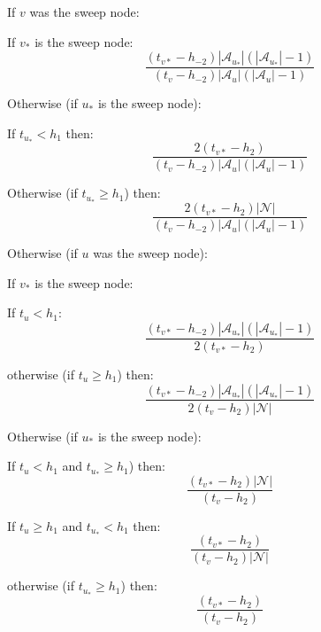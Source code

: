 \documentclass[letterpaper]{article}
\begin{document}
\begin{compactenum} 
	\item If $v$ was the sweep node:
	\begin{compactenum} 
		\item If $v_*$ is the sweep node:
		\[\frac{(t_{v*}-h_{-2})|\mathcal{A}_{u_*}|(|\mathcal{A}_{u_*}|-1)}{(t_{v}-h_{-2})|\mathcal{A}_{u}|(|\mathcal{A}_{u}|-1)}\]
	   \item Otherwise (if $u_*$ is the sweep node):
		\begin{compactenum} 
			\item If $t_{u_*} < h_1$ then:
		\[\frac{2(t_{v*}-h_{2})}{(t_{v}-h_{-2})|\mathcal{A}_{u}|(|\mathcal{A}_{u}|-1)}\]
			\item Otherwise (if $t_{u_*} \geq h_1$) then:
		\[\frac{2(t_{v*}-h_{2})|\mathcal{N}|}{(t_{v}-h_{-2})|\mathcal{A}_{u}|(|\mathcal{A}_{u}|-1)}\]
		\end{compactenum} 
	\end{compactenum} 
	\item Otherwise (if $u$ was the sweep node):
	\begin{compactenum} 
		\item If $v_*$ is the sweep node:
		\begin{compactenum} 
			\item If $t_{u} < h_1$:
			\[\frac{(t_{v*}-h_{-2})|\mathcal{A}_{u_*}|(|\mathcal{A}_{u_*}|-1)}{2(t_{v*}-h_{2})}\]
			\item otherwise (if $t_{u} \geq h_1$) then:
			\[\frac{(t_{v*}-h_{-2})|\mathcal{A}_{u_*}|(|\mathcal{A}_{u_*}|-1)}{2(t_{v}-h_{2})|\mathcal{N}|}\]
		\end{compactenum} 
		\item Otherwise (if $u_*$ is the sweep node):
		\begin{compactenum} 
			\item If $t_{u} < h_1$ and $t_{u_*} \geq h_1$) then:
				\[ \frac{(t_{v*}-h_{2})|\mathcal{N}|}{(t_{v}-h_{2})} \]
			\item If $t_{u} \geq h_1$ and  $t_{u_*} < h_1$ then:
				\[\frac{(t_{v*}-h_{2})}{(t_{v}-h_{2})|\mathcal{N}|}\]
			\item otherwise (if $t_{u_*} \geq h_1$) then:
				\[ \frac{(t_{v*}-h_{2})}{(t_{v}-h_{2})} \]
		\end{compactenum} 
	\end{compactenum} 
\end{compactenum} 
\end{document}
